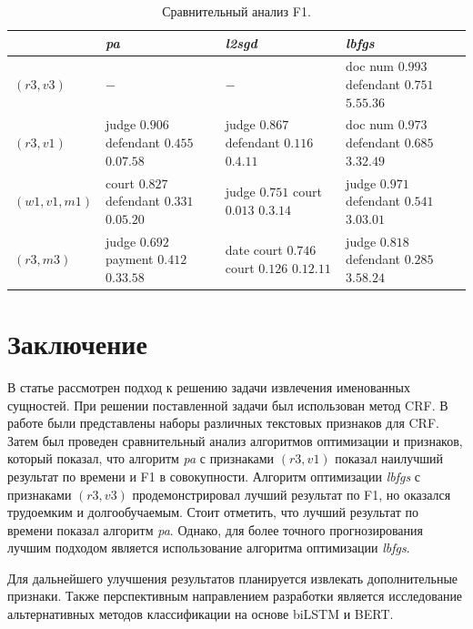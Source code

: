 \documentclass{csmathnotes}
\begin{document}
\begin{table}[h]
	\begin{center}
		\begin{tabular}{|p{2.1cm}|p{2.5cm}|p{2.5cm}|p{2.5cm}|}
			\hline
			\diagbox[width=7.2em]{Признаки}{Алгоритм} &  \emph{pa} & \emph{l2sgd} & \emph{lbfgs} \\
			\hline
			$(r3, v3)$ & $-$ & $-$ & 
			doc num  $0.993$ \newline
			defendant  $0.751$ 
			\newline  $5.55.36$ \\
			\hline
			$(r3, v1)$ & judge $0.906$ \newline
			defendant   $0.455$ 
			\newline $0.07.58$
			& judge  $0.867$ \newline
			defendant    $0.116$ \newline
			$0.4.11$
			& doc num  $0.973$ \newline
			defendant  $0.685$\newline
			$3.32.49$ \\
			\hline
			$(w1, v1, m1)$ 
			& court   $0.827$ \newline
			defendant   $0.331$ \newline
			$0.05.20$
			& judge    $0.751$ \newline
			court  $0.013$ \newline
			$0.3.14$
			& judge $0.971$\newline
			defendant  $0.541$\newline
			$3.03.01$\\
			\hline
			$(r3, m3)$
			& judge $0.692$ \newline
			payment $0.412$ \newline
			$0.33.58$
			& date court   $0.746$ \newline
			court $0.126$ \newline
			$0.12.11$
			& judge $0.818$ \newline
			defendant $0.285$ \newline 
			$3.58.24$\\
			\hline
		\end{tabular}
	\end{center}
	\caption{\label{tabl:table2}Сравнительный анализ F1.}
\end{table}

\section*{Заключение}
В статье рассмотрен подход к решению задачи извлечения именованных сущностей. При решении поставленной задачи был использован метод CRF. В работе были представлены наборы различных текстовых признаков для CRF. 
Затем был проведен сравнительный анализ алгоритмов оптимизации и признаков, который показал, что алгоритм \emph{pa} с признаками $(r3, v1)$ показал наилучший результат по времени и F1 в совокупности. Алгоритм оптимизации \emph{lbfgs}  с признаками $(r3, v3)$ продемонстрировал лучший результат по F1, но оказался трудоемким и долгообучаемым. Стоит отметить, что лучший результат  по времени показал алгоритм \emph{pa}. Однако, для более точного прогнозирования лучшим подходом является использование алгоритма оптимизации \emph{lbfgs}.


Для дальнейшего улучшения результатов планируется извлекать дополнительные признаки. Также перспективным направлением разработки является исследование альтернативных методов классификации на основе biLSTM и BERT.

\printbibliography
\end{document}
